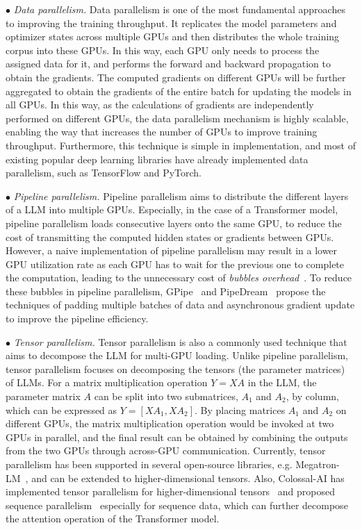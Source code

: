 $\bullet$ \emph{Data parallelism.} Data parallelism is one of the most fundamental approaches to improving the training throughput. It  replicates the model parameters and optimizer states across multiple GPUs and then distributes the whole training corpus into these GPUs. In this way, each GPU only needs to process the assigned data for it, and performs the forward and backward propagation to obtain the gradients. The computed gradients on different GPUs will be further aggregated to obtain the gradients of the entire batch for updating the models in all GPUs. In this way, as the calculations of gradients are independently performed on different GPUs, the data parallelism mechanism is highly scalable, {enabling the way that increases the number of GPUs to improve training throughput.} Furthermore,  this technique is simple in implementation, and most of existing popular deep learning libraries have already implemented data parallelism, such as TensorFlow and PyTorch.

$\bullet$ \emph{Pipeline parallelism.} Pipeline parallelism aims to distribute the different layers of a LLM into multiple GPUs. Especially, in the case of a Transformer model, pipeline parallelism loads consecutive layers onto the same GPU, to reduce the cost of transmitting the computed hidden states or gradients between GPUs. However, a naive implementation of pipeline parallelism may result in a lower GPU utilization rate as each GPU has to wait for the previous one to complete the computation, leading to the unnecessary cost of \emph{bubbles overhead}{~\cite{Huang-NeurIPS-2019-GPipe}}. To reduce these bubbles in pipeline parallelism, GPipe~\cite{Huang-NeurIPS-2019-GPipe} and PipeDream~\cite{Harlap-arXiv-2018-PipeDream} propose the techniques of padding multiple batches of data and asynchronous gradient update to improve the pipeline efficiency.

$\bullet$ \emph{Tensor parallelism.} Tensor parallelism is also a commonly used technique that aims to decompose the LLM for multi-GPU loading. Unlike pipeline parallelism, tensor parallelism focuses on decomposing the tensors (the parameter matrices) of LLMs. For a matrix multiplication operation $Y = XA$ in the LLM, the parameter matrix $A$ can be split into two submatrices, $A_1$ and $A_2$, by column, which can be expressed as $Y = [X A_1, X A_2]$. By placing matrices $A_1$ and $A_2$ on different GPUs, the matrix multiplication operation would be invoked at two GPUs in parallel, and the final result can be obtained by combining the outputs from the two GPUs through across-GPU communication. Currently, tensor parallelism has been supported in several open-source libraries, e.g. Megatron-LM~\cite{Shoeybi-arXiv-2019-Megatron}, and can be extended to higher-dimensional tensors. Also, Colossal-AI has  implemented tensor parallelism for higher-dimensional tensors~\cite{Xu-arXiv-2021-An,Wang-ICPP-2022-Tesseract,Bian-arXiv-2021-Maximizing} and proposed sequence parallelism~\cite{Li-arXiv-2021-Sequence}  especially for sequence data, which can further decompose the attention operation of the Transformer model.

